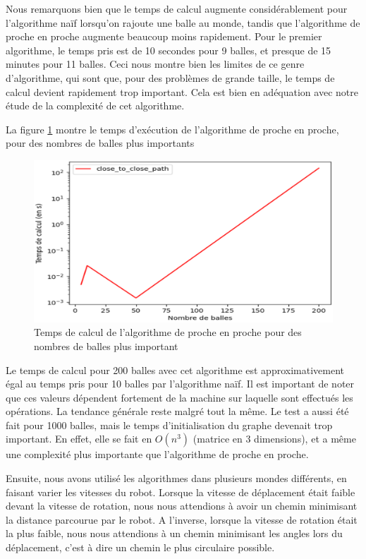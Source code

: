 \documentclass[12pt]{article}
\begin{document}
    Nous remarquons bien que le temps de calcul augmente considérablement pour l'algorithme naïf lorsqu'on rajoute une balle au monde, tandis que l'algorithme de proche en proche augmente beaucoup moins rapidement. Pour le premier algorithme, le temps pris est de 10 secondes pour 9 balles, et presque de 15 minutes pour 11 balles. Ceci nous montre bien les limites de ce genre d'algorithme, qui sont que, pour des problèmes de grande taille, le temps de calcul devient rapidement trop important. Cela est bien en adéquation avec notre étude de la complexité de cet algorithme.

    La figure \ref{fig:timemoreballs} montre le temps d'exécution de l'algorithme de proche en proche, pour des nombres de balles plus importants

    \begin{figure}[H]
      \centering
      \includegraphics[width=\textwidth]{img/time_more_balls}
      \caption{Temps de calcul de l'algorithme de proche en proche pour des nombres de balles plus important}
      \label{fig:timemoreballs}
  \end{figure}

    Le temps de calcul pour 200 balles avec cet algorithme est approximativement égal au temps pris pour 10 balles par l'algorithme naïf. Il est important de noter que ces valeurs dépendent fortement de la machine sur laquelle sont effectués les opérations. La tendance générale reste malgré tout la même.
    Le test a aussi été fait pour 1000 balles, mais le temps d'initialisation du graphe devenait trop important. En effet, elle se fait en $O(n^3)$ (matrice en 3 dimensions), et a même une complexité plus importante que l'algorithme de proche en proche. 
    
    \medskip
    
    Ensuite, nous avons utilisé les algorithmes dans plusieurs mondes différents, en faisant varier les vitesses du robot. Lorsque la vitesse de déplacement était faible devant la vitesse de rotation, nous nous attendions à avoir un chemin minimisant la distance parcourue par le robot. A l'inverse, lorsque la vitesse de rotation était la plus faible, nous nous attendions à un chemin minimisant les angles lors du déplacement, c'est à dire un chemin le plus circulaire possible.
\end{document}
